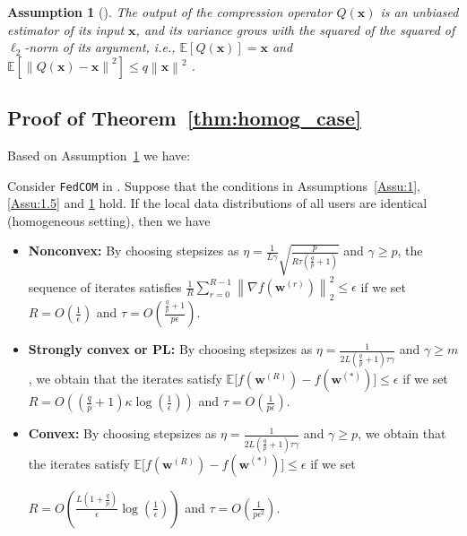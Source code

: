 \documentclass[review,onefignum,onetabnum]{siamart190516}
\newtheorem{assumption}{Assumption}
\begin{document}
\begin{assumption}[\cite{haddadpour2020federated}]\label{Assu:quant}
The output of the compression operator $Q(\mathbf{x})$ is an unbiased estimator of its input $\mathbf{x}$, and its variance grows with the squared of the squared of $\ell_2$-norm of its argument, i.e., $\mathbb{E}\left[Q(\mathbf{x})\right]=\mathbf{x}$ and $\mathbb{E}\left[\left\|Q(\mathbf{x})-\mathbf{x}\right\|^2\right]\leq q\left\|\mathbf{x}\right\|^2$ .
\end{assumption}


\subsection{Proof of Theorem~\ref{thm:homog_case}}
Based on Assumption~\ref{Assu:quant} we have:
\begin{theorem}\label{thm:fromhaddad}
 Consider \texttt{FedCOM} in \cite{haddadpour2020federated}. Suppose that the conditions in Assumptions~\ref{Assu:1}, \ref{Assu:1.5} and \ref{Assu:quant} hold. If the local data distributions of all users are identical (homogeneous setting), then we have  
 \begin{itemize}
     \item \textbf{Nonconvex:}  By choosing stepsizes as $\eta=\frac{1}{L\gamma}\sqrt{\frac{p}{R\tau\left(\frac{q}{p}+1\right)}}$ and $\gamma\geq p$, the sequence of iterates satisfies  $\frac{1}{R}\sum_{r=0}^{R-1}\left\|\nabla f({\boldsymbol{w}}^{(r)})\right\|_2^2\leq {\epsilon}$ if we set
     $R=O\left(\frac{1}{\epsilon}\right)$ and $ \tau=O\left(\frac{\frac{q}{p}+1}{{p}\epsilon}\right)$.
     \item \textbf{Strongly convex or PL:}
      By choosing stepsizes as $\eta=\frac{1}{2L\left(\frac{q}{p}+1\right)\tau\gamma}$ and $\gamma\geq m$, we obtain that the iterates satisfy $\mathbb{E}\Big[f({\boldsymbol{w}}^{(R)})-f({\boldsymbol{w}}^{(*)})\Big]\leq \epsilon$ if  we set
     $R=O\left(\left(\frac{q}{p}+1\right)\kappa\log\left(\frac{1}{\epsilon}\right)\right)$ and $ \tau=O\left(\frac{1}{p\epsilon}\right)$.
     \item \textbf{Convex:} By choosing stepsizes as $\eta=\frac{1}{2L\left(\frac{q}{p}+1\right)\tau\gamma}$ and $\gamma\geq p$, we obtain that the iterates satisfy $ \mathbb{E}\Big[f({\boldsymbol{w}}^{(R)})-f({\boldsymbol{w}}^{(*)})\Big]\leq \epsilon$ if we set
     
     $R=O\left(\frac{L\left(1+\frac{q}{p}\right)}{\epsilon}\log\left(\frac{1}{\epsilon}\right)\right)$ and $ \tau=O\left(\frac{1}{p\epsilon^2}\right)$.
 \end{itemize}
\end{theorem}
\end{document}
